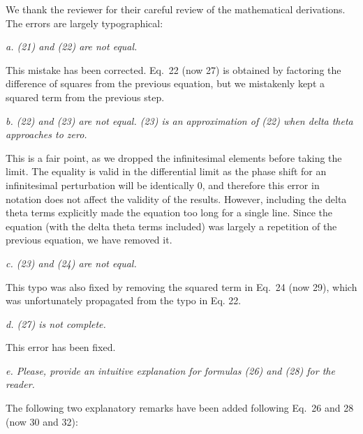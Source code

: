 \documentclass[11pt, letterpaper]{article}
\newenvironment{reviewer}{\itshape\color{gray}}{}
\begin{document}
We thank the reviewer for their careful review of the mathematical derivations. The errors are largely typographical:

\begin{reviewer}
a. (21) and (22) are not equal. 
\end{reviewer}

This mistake has been corrected.
Eq.~22 (now 27) is obtained by factoring the difference of squares from the previous equation, but we mistakenly kept a squared term from the previous step.

\begin{reviewer}
b. (22) and (23) are not equal. (23) is an approximation of (22) when delta theta approaches to zero. 
\end{reviewer}

This is a fair point, as we dropped the infinitesimal elements before taking the limit.
The equality is valid in the differential limit as the phase shift for an infinitesimal perturbation will be identically 0, and therefore this error in notation does not affect the validity of the results.
However, including the delta theta terms explicitly made the equation too long for a single line.
Since the equation (with the delta theta terms included) was largely a repetition of the previous equation, we have removed it.

\begin{reviewer}
c. (23) and (24) are not equal.
\end{reviewer}

This typo was also fixed by removing the squared term in Eq.~24 (now 29), which was unfortunately propagated from the typo in Eq.
22.

\begin{reviewer}
d. (27) is not complete.
\end{reviewer}

This error has been fixed.

\begin{reviewer}
e. Please, provide an intuitive explanation for formulas (26) and (28) for the reader. 
\end{reviewer}

The following two explanatory remarks have been added following Eq.~26 and 28 (now 30 and 32):
\end{document}
